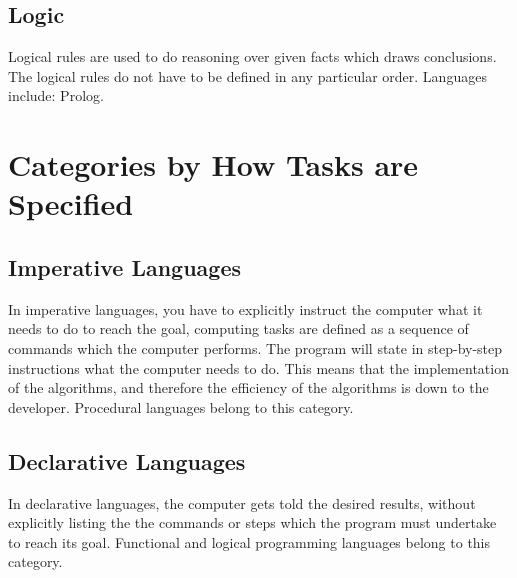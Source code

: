 \subsection{Logic}
Logical rules are used to do reasoning over given facts which draws conclusions. The logical rules do not have to be defined in any particular order. Languages include: Prolog.

\section{Categories by How Tasks are Specified}
\subsection{Imperative Languages}
In imperative languages, you have to explicitly instruct the computer what it needs to do to reach the goal, computing tasks are defined as a sequence of commands which the computer performs. The program will state in step-by-step instructions what the computer needs to do. This means that the implementation of the algorithms, and therefore the efficiency of the algorithms is down to the developer. Procedural languages belong to this category. 
\subsection{Declarative Languages}
In declarative languages, the computer gets told the desired results, without explicitly listing the the commands or steps which the program must undertake to reach its goal. Functional and logical programming languages belong to this category.